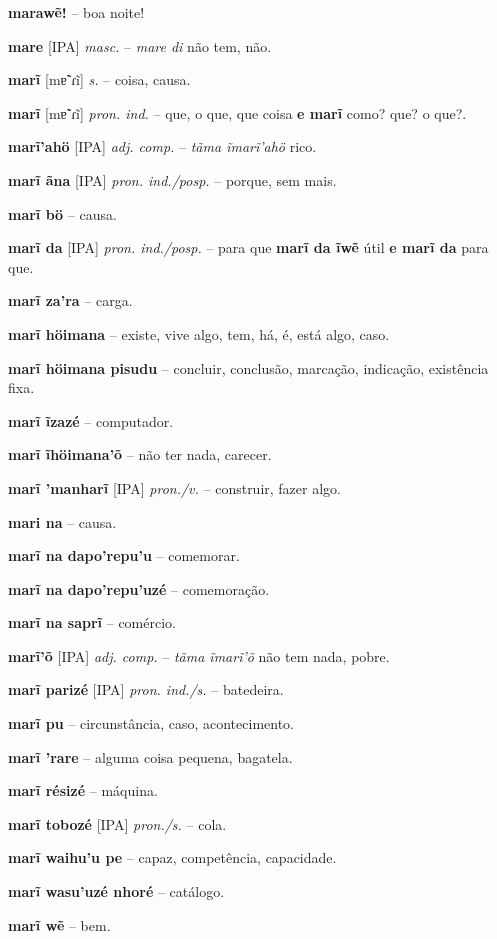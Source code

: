\textbf{marawẽ!} -- boa noite!

\textbf{mare} [IPA] \textit{masc.} -- \textit{mare di} não tem, não.

\textbf{marĩ} [mɐ̃ˈɾĩ] \textit{s.} -- coisa, causa.

\textbf{marĩ} [mɐ̃ˈɾĩ] \textit{pron. ind.} -- que, o que, que coisa  \textbf{e marĩ} como? que? o que?.

\textbf{marĩ'ahö} [IPA] \textit{adj. comp.} -- \textit{tãma ĩmarĩ'ahö} rico.

\textbf{marĩ ãna} [IPA] \textit{pron. ind./posp.} -- porque, sem mais.

\textbf{marĩ bö} -- causa.

\textbf{marĩ da} [IPA] \textit{pron. ind./posp.} -- para que  \textbf{marĩ da ĩwẽ} útil  \textbf{e marĩ da} para que.

\textbf{marĩ za'ra} -- carga.

\textbf{marĩ höimana} -- existe, vive algo, tem, há, é, está algo, caso.

\textbf{marĩ höimana pisudu} -- concluir, conclusão, marcação, indicação, existência fixa.

\textbf{marĩ ĩzazé} -- computador.

\textbf{marĩ ĩhöimana'õ} -- não ter nada, carecer.

\textbf{marĩ 'manharĩ} [IPA] \textit{pron./v.} -- construir, fazer algo.

\textbf{mari na} -- causa.

\textbf{marĩ na dapo'repu'u} -- comemorar.

\textbf{marĩ na dapo'repu'uzé} -- comemoração.

\textbf{marĩ na saprĩ} -- comércio.

\textbf{marĩ'õ} [IPA] \textit{adj. comp.} -- \textit{tãma ĩmarĩ'õ} não tem nada, pobre.

\textbf{marĩ parizé} [IPA] \textit{pron. ind./s.} -- batedeira.

\textbf{marĩ pu} -- circunstância, caso, acontecimento.

\textbf{marĩ 'rare} -- alguma coisa pequena, bagatela.

\textbf{marĩ résizé} -- máquina.

\textbf{marĩ tobozé} [IPA] \textit{pron./s.} -- cola.

\textbf{marĩ waihu'u pe} -- capaz, competência, capacidade.

\textbf{marĩ wasu'uzé nhoré} -- catálogo.

\textbf{marĩ wẽ} -- bem.

